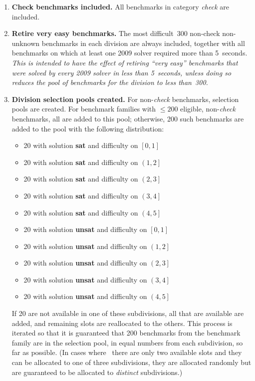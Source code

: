\documentclass[12pt]{article}
\begin{document}
\begin{enumerate}

\item \textbf{Check benchmarks included.} %
  All benchmarks in category \emph{check} are included.

\item \textbf{Retire very easy benchmarks.} %
  The most difficult~300 non-check non-unknown benchmarks in each
  division are always included, together with all benchmarks on which
  at least one 2009 solver required more than 5~seconds.  \emph{This
    is intended to have the effect of retiring ``very easy''
    benchmarks that were solved by every 2009 solver in less
    than 5~seconds, \emph{unless} doing so reduces the pool of
    benchmarks for the division to less than~300.}

\item\label{step:pool} \textbf{Division selection pools created.} %
  For non-\emph{check} benchmarks, selection pools are created.
  For benchmark families with $\leq200$ eligible,
  non-\emph{check} benchmarks, all are added to this pool;
  otherwise, 200 such benchmarks are added to the pool with the
  following distribution:
%
  \begin{itemize}
  \item 20 with solution \textbf{sat} and difficulty on $\left[0,1\right]$
  \item 20 with solution \textbf{sat} and difficulty on $\left(1,2\right]$
  \item 20 with solution \textbf{sat} and difficulty on $\left(2,3\right]$
  \item 20 with solution \textbf{sat} and difficulty on $\left(3,4\right]$
  \item 20 with solution \textbf{sat} and difficulty on $\left(4,5\right]$
  \item 20 with solution \textbf{unsat} and difficulty on $\left[0,1\right]$
  \item 20 with solution \textbf{unsat} and difficulty on $\left(1,2\right]$
  \item 20 with solution \textbf{unsat} and difficulty on $\left(2,3\right]$
  \item 20 with solution \textbf{unsat} and difficulty on $\left(3,4\right]$
  \item 20 with solution \textbf{unsat} and difficulty on $\left(4,5\right]$
  \end{itemize}
%
  If 20 are not available in one of these subdivisions, all that are
  available are added, and remaining slots are reallocated to the
  others.  This process is iterated so that it is guaranteed that 200
  benchmarks from the benchmark family are in the selection pool, in
  equal numbers from each subdivision, so far as possible.
  (In cases where \eg\ there are only two available slots and
  they can be allocated to one of three subdivisions, they are allocated
  randomly but are guaranteed to be allocated to \emph{distinct}
  subdivisions.)


\end{enumerate}
\end{document}
